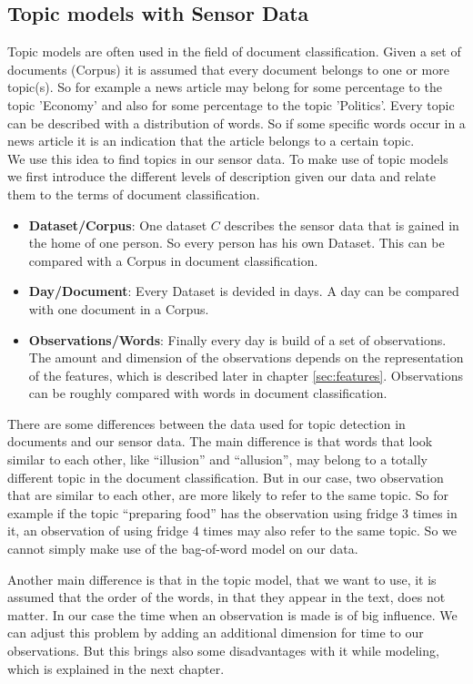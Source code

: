 \documentclass[11pt,a4paper]{article}
\begin{document}
\subsection{Topic models with Sensor Data}
Topic models are often used in the field of document classification. Given a set of documents (Corpus) it is assumed that every document belongs to one or more topic(s). So for example a news article may belong for some percentage to the topic 'Economy' and also for some percentage to the topic 'Politics'. Every topic can be described with a distribution of words. So if some specific words occur in a news article it is an indication that the article belongs to a certain topic.\\
We use this idea to find topics in our sensor data. To make use of topic models we first introduce the different levels of description given our data and relate them to the terms of document classification.
\begin{itemize}
 \item \textbf{Dataset/Corpus}: One dataset $C$ describes the sensor data that is gained in the home of one person. So every person has his own Dataset. This can be compared with a Corpus in document classification.
 \item \textbf{Day/Document}: Every Dataset is devided in days. A day can be compared with one document in a Corpus.
 \item \textbf{Observations/Words}: Finally every day is build of a set of observations. The amount and dimension of the observations depends on the representation of the features, which is described later in chapter \ref{sec:features}. Observations can be roughly compared with words in document classification.
\end{itemize}




There are some differences between the data used for topic detection in documents and our sensor data. The main difference is that words that look similar to each other, like ``illusion'' and ``allusion'', may belong to a totally different topic in the document classification. But in our case, two observation that are similar to each other, are more likely to refer to the same topic. So for example if the topic ``preparing food'' has the observation using fridge 3 times in it, an observation of using fridge 4 times may also refer to the same topic. So we cannot simply make use of the bag-of-word model on our data.

Another main difference is that in the topic model, that we want to use, it is assumed that the order of the words, in that they appear in the text, does not matter. In our case the time when an observation is made is of big influence. We can adjust this problem by adding an additional dimension for time to our observations. But this brings also some disadvantages with it while modeling, which is explained in the next chapter.
\end{document}

